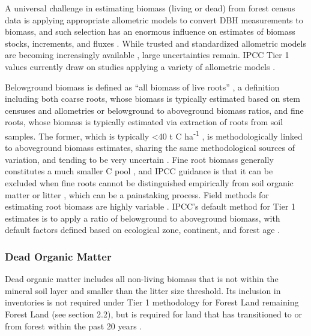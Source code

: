 \documentclass[, manuscript]{copernicus}
\begin{document}
A universal challenge in estimating biomass (living or dead) from forest
census data is applying appropriate allometric models to convert DBH
measurements to biomass, and such selection has an enormous influence on
estimates of biomass stocks, increments, and fluxes
\citep{clark_landscapescale_2000, clark_net_2001}. While trusted and
standardized allometric models are becoming increasingly available
\citep{chave_improved_2014, rejou-mechain_biomass_2017, gonzalez-akre_allodb_2022},
large uncertainties remain. IPCC Tier 1 values currently draw on studies
applying a variety of allometric models
\citep[e.g.,][]{requenasuarez_estimating_2019, rozendaal_aboveground_2022}.

Belowground biomass is defined as ``all biomass of live roots''
\citep{ipcc_good_2003, ipcc_2006_2006}, a definition including both
coarse roots, whose biomass is typically estimated based on stem
censuses and allometries or belowground to aboveground biomass ratios,
and fine roots, whose biomass is typically estimated via extraction of
roots from soil samples. The former, which is typically \textless40 t C
ha\textsuperscript{-1} \citep{anderson-teixeira_carbon_2021}, is
methodologically linked to aboveground biomass estimates, sharing the
same methodological sources of variation, and tending to be very
uncertain \citep[e.g.,][]{keller_biomass_2001}. Fine root biomass
generally constitutes a much smaller C pool \citep[typically \textless5
t C ha\textsuperscript{-1},][]{anderson-teixeira_carbon_2021}, and IPCC
guidance is that it can be excluded when fine roots cannot be
distinguished empirically from soil organic matter or litter
\citep{ipcc_2006_2006}, which can be a painstaking process. Field
methods for estimating root biomass are highly variable
\citep{freschet_starting_2021}. IPCC's default method for Tier 1
estimates is to apply a ratio of belowground to aboveground biomass,
with default factors defined based on ecological zone, continent, and
forest age \citep{ipcc_2006_2006, ipcc_2019_2019}.

\subsubsection{Dead Organic Matter}

Dead organic matter includes all non-living biomass that is not within
the mineral soil layer and smaller than the litter size threshold. Its
inclusion in inventories is not required under Tier 1 methodology for
Forest Land remaining Forest Land (see section 2.2), but is required for
land that has transitioned to or from forest within the past 20 years
\citep{ipcc_2006_2006}.
\end{document}
